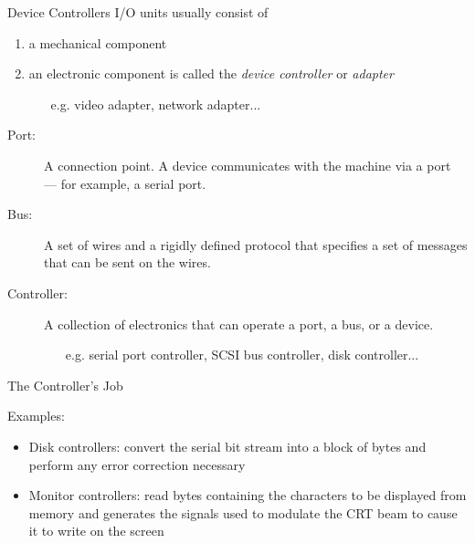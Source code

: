 \begin{frame}{Device Controllers}
  I/O units usually consist of
  \begin{enumerate}
  \item a mechanical component
  \item an electronic component is called the \emph{device controller} or \emph{adapter}
    \begin{itemize}
    \item[e.g.] video adapter, network adapter...
    \end{itemize}
  \end{enumerate}
  \begin{center}
     
  \end{center}
\end{frame}

\begin{frame}
  \begin{description}
  \item[Port:] A connection point. A device communicates with the machine via a port ---
    for example, a serial port.
  \item[Bus:] A set of wires and a rigidly defined protocol that specifies a set of
    messages that can be sent on the wires.
  \item[Controller:] A collection of electronics that can operate a port, a bus, or a device.
    \begin{itemize}
    \item[e.g.] serial port controller, SCSI bus controller, disk controller...
    \end{itemize}
  \end{description}
\end{frame}

\begin{frame}{The Controller's Job}
  \begin{block}{Examples:}
    \begin{itemize}
    \item \alert{Disk controllers:} convert the serial bit stream into a block of bytes
      and perform any error correction necessary
    \item \alert{Monitor controllers:} read bytes containing the characters to be
      displayed from memory and generates the signals used to modulate the CRT beam to
      cause it to write on the screen
    \end{itemize}
  \end{block}
\end{frame}

